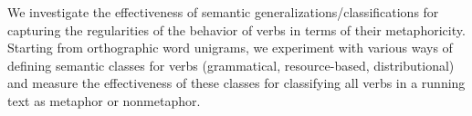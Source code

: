 We investigate the effectiveness of semantic generalizations/classifications for capturing the regularities of the behavior of verbs in terms of their metaphoricity. Starting from orthographic word unigrams, we experiment with various ways of defining semantic classes for verbs (grammatical, resource-based, distributional) and measure the effectiveness of these classes for classifying all verbs in a running text as metaphor or nonmetaphor.
